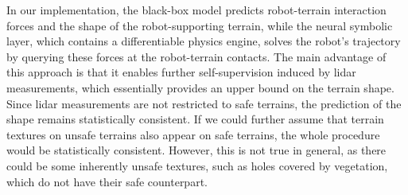 
In our implementation,
the black-box model predicts robot-terrain interaction forces and the shape of the robot-supporting terrain,
while the neural symbolic layer, which contains a differentiable physics engine, solves the robot's trajectory
by querying these forces at the robot-terrain contacts.
The main advantage of this approach is that it enables further self-supervision induced by lidar measurements,
which essentially provides an
upper bound on the terrain shape.
Since lidar measurements are not restricted to safe terrains,
the prediction of the shape remains statistically consistent.
If we could further assume that terrain textures on unsafe terrains also appear on safe terrains,
the whole procedure would be statistically consistent.
However, this is not true in general, as there could be some inherently unsafe textures,
such as holes covered by vegetation,
which do not have their safe counterpart.

